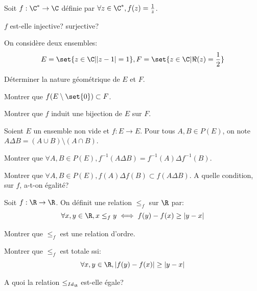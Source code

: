 \documentclass[11pt,a4paper]{article}
\begin{document}
\begin{exercise}
Soit $f:\C^*\to \C$ définie par $\forall z\in\C^*, f(z)=\frac{1}{z}$.
\begin{questions}
\item $f$ est-elle injective? surjective?
\item On considère deux ensembles:
$$E=\set{z\in\C| |z-1|=1}, F=\set{z\in\C|\Re(z)=\frac{1}{2}}$$
\begin{questions}
\item Déterminer la nature géométrique de $E$ et $F$.
\item Montrer que $f(E\setminus\set{0})\subset F$.
\item Montrer que $f$ induit une bijection de $E$ sur $F$.
\end{questions}
\end{questions}
\end{exercise}

\begin{exercise}
Soient $E$ un ensemble non vide et $f:E\to E$. 
Pour tous $A,B\in P(E)$, on note $A\Delta B=(A\cup B)\setminus(A\cap B)$.
\begin{questions}
\item Montrer que $\forall A,B\in P(E), f^{-1}(A\Delta B)=f^{-1}(A)\Delta f^{-1}(B)$.
\item Montrer que $\forall A,B\in P(E), f(A)\Delta f(B)\subset f(A\Delta B)$. 
A quelle condition, sur $f$, a-t-on égalité?
\end{questions}
\end{exercise}

\begin{exercise}
Soit $f:\R\to \R$. On définit une relation $\le_f$ sur $\R$ par:
$$\forall x,y\in\R, x\le_f y \iff f(y)-f(x)\ge|y-x|$$
\begin{questions}
\item Montrer que $\le_f$ est une relation d'ordre.
\item Montrer que $\le_f$ est totale ssi:
$$\forall x,y\in\R, |f(y)-f(x)|\ge|y-x|$$
\item A quoi la relation $\le_{Id_{\R}}$ est-elle égale?
\end{questions}
\end{exercise}
\end{document}
